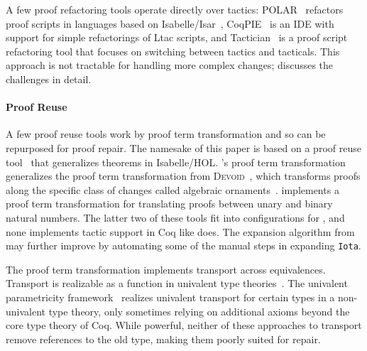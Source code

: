 A few proof refactoring tools operate directly over tactics:
POLAR~\cite{Dietrich2013} refactors proof scripts in languages based on Isabelle/Isar~\cite{Wenzel2007isar},
CoqPIE~\cite{Roe2016} is an IDE with support for simple refactorings of Ltac scripts, and
Tactician~\cite{adams2015} is a proof script refactoring tool that focuses on switching between tactics and tacticals.
This approach is not tractable for handling more complex changes;
\citet{robert2018} discusses the challenges in detail.

\paragraph{Proof Reuse}

A few proof reuse tools work by proof term transformation and so can be repurposed for proof repair.
The namesake of this paper is based on a proof reuse tool~\cite{Johnsen2004}
that generalizes theorems in Isabelle/HOL.
\toolname's proof term transformation generalizes the proof term transformation from \textsc{Devoid}~\cite{Ringer2019},
which transforms proofs along the specific class of changes called algebraic ornaments~\cite{mcbride}.
\citet{magaud2000changing} implements a proof term transformation for translating proofs between
unary and binary natural numbers. 
The latter two of these tools fit into configurations for \toolname,
and none implements tactic support in Coq like \toolname does.
The expansion algorithm from \citet{magaud2000changing} may further improve \toolname
by automating some of the manual steps in expanding \lstinline{Iota}.

The \toolname proof term transformation implements transport across equivalences.
Transport is realizable as a function in univalent type theories~\cite{univalent2013homotopy}.
The univalent parametricity framework~\cite{tabareau2017equivalences} realizes univalent transport for certain types
in a non-univalent type theory, only sometimes relying on additional axioms beyond the core type theory of Coq.
While powerful, neither of these approaches to transport remove references to the old type, making them poorly suited for repair.

